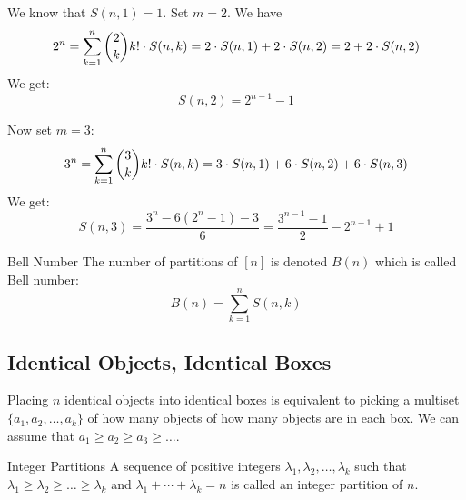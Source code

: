 \documentclass{report}
\begin{document}
\begin{examples}
    \begin{example}
        We know that $S(n, 1) = 1$. Set $m = 2$. We have
            \begin{equation*}
                2^{n} = \sum_{k = 1}^{n} \dbinom{2}{k} k! \cdot S(n, k) = 2 \cdot S(n, 1) + 2 \cdot S(n, 2) = 2 + 2 \cdot S(n, 2)
            \end{equation*}
        We get:
            \begin{equation*}
                S(n, 2) = 2^{n -1} - 1
            \end{equation*}
    \end{example}
    \begin{example}
        Now set $m = 3$:
            \begin{equation*}
                3^{n} = \sum_{k = 1}^{n} \dbinom{3}{k} k! \cdot S(n, k) = 3 \cdot S(n, 1) + 6 \cdot S(n, 2) + 6 \cdot S(n, 3)
            \end{equation*}
        We get:
            \begin{equation*}
                S(n, 3) = \dfrac{3^{n} - 6(2^{n} - 1) - 3}{6} = \dfrac{3^{n - 1} - 1}{2} - 2^{n - 1} + 1
            \end{equation*}
    \end{example}
\end{examples}

\begin{definition}{Bell Number}
    The number of partitions of $[n]$ is denoted $B(n)$ which is called Bell number:
        \begin{equation*}
            B(n) = \sum_{k = 1}^{n} S(n, k)
        \end{equation*}
\end{definition}

\begin{topic}
    \section{Identical Objects, Identical Boxes}
\end{topic}

Placing $n$ identical objects into identical boxes is equivalent to picking a multiset $\{a_{1}, a_{2}, \ldots , a_{k}\}$ of how many objects of how many objects are in each box. We can assume that $a_{1} \geq a_{2} \geq a_{3} \geq \ldots $.

\begin{definition}{Integer Partitions}
    A sequence of positive integers $\lambda_{1}, \lambda_{2}, \ldots , \lambda_{k}$ such that $\lambda_{1} \geq \lambda_{2} \geq \ldots  \geq \lambda_{k}$ and $\lambda_{1} + \cdots  + \lambda_{k} = n$ is called an integer partition of $n$. 
\end{definition}
\end{document}
